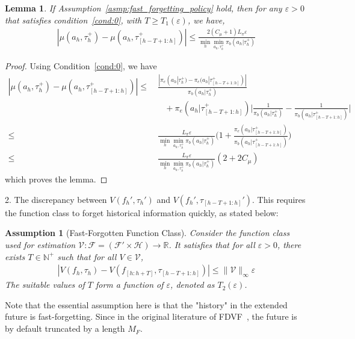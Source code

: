 \documentclass[twoside]{article}
\newtheorem{lemma}{Lemma}
\newtheorem{assumption}{Assumption}
\newcommand{\N}{\mathbb{N}}
\newcommand{\CAL}[1]{\mathcal{#1}}
\begin{document}
\begin{lemma}\label{lem:error_1}
If Assumption~\ref{asmp:fast_forgetting_policy} hold, then for any $\varepsilon > 0$ that satisfies condition~\ref{cond:0}, with $T \geq T_1(\varepsilon)$, we have,
\begin{align}
|\mu(a_h,\tau_h^+)-\mu(a_h,\tau_{[h-T+1:h]}^+)|\leq \frac{2{(C_\mu+1)}L_\pi \varepsilon}{\min_h\min_{a_h,\tau_h^+}\pi_b(a_h|\tau_h^+)}
\end{align}
\end{lemma}
\begin{proof} Using Condition~\ref{cond:0}, we have
\begin{align}
    |\mu(a_h,\tau_h^+)-\mu(a_h,\tau_{[h-T+1:h]}^+)|\leq&\  \frac{|\pi_e(a_h|\tau_h^+)-\pi_e(a_h|\tau_{[h-T+1:h]}^+)|}{\pi_b(a_h|\tau_h^+)}\nonumber\\&\quad+\pi_e(a_h|\tau_{[h-T+1:h]}^+)\bigg|\frac{1}{\pi_b(a_h|\tau_h^+)}-\frac{1}{\pi_b(a_h|\tau_{[h-T+1:h]}^+)}\bigg|\\
    \leq&\ \frac{L_\pi\varepsilon}{\min_h\min_{a_h,\tau_h^+}\pi_b(a_h|\tau_h^+)}\bigg(1+\frac{\pi_e(a_h|\tau_{[h-T+1:h]}^+)}{\pi_b(a_h|\tau_{[h-T+1:h]}^+)}\bigg)\\
    \leq&\ \frac{L_\pi\varepsilon}{\min_h\min_{a_h,\tau_h^+}\pi_b(a_h|\tau_h^+)}(2+2C_\mu)
\end{align}
which proves the lemma.
\end{proof}

2. The discrepancy between $V(f_h',\tau_h')$ and $V(f_h',\tau_{[h-T+1:h]}')$.
This requires the function class to forget historical information quickly, as stated below:

\begin{assumption}[Fast-Forgotten Function Class]\label{asmp:fast_forgetting_function_class}
Consider the function class used for estimation $\CAL{V} : \CAL{F} = (\CAL{F}' \times \CAL{H}) \to \mathbb{R}$. It satisfies that for all $\varepsilon > 0$, there exists $T \in \N^+$ such that for all $V \in \CAL{V}$,
\begin{align}
|V(f_h,\tau_h)-V(f_{[h:h+T]},\tau_{[h-T+1:h]})|\leq \|\CAL{V}\|_\infty\varepsilon
\end{align}
The suitable values of $T$ form a function of $\varepsilon$, denoted as $T_2(\varepsilon)$.
\end{assumption}
Note that the essential assumption here is that the "history" in the extended future is fast-forgetting. Since in the original literature of FDVF~\cite{NEURIPS2023_3380e811}, the future is by default truncated by a length $M_F$.
\end{document}
